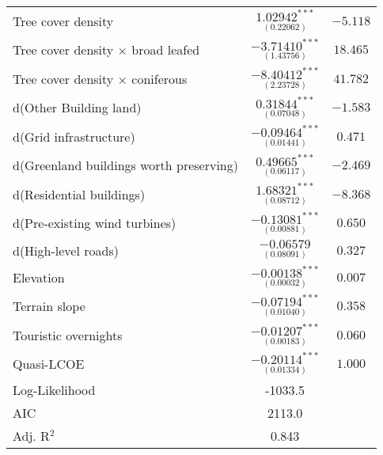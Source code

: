 \begin{ThreePartTable}
\begin{longtable}{l c c}
         Tree cover density                           & $\underset{(0.22062)}{1.02942^{***}}$  & $-5.118$ \\
         Tree cover density $\times$ broad leafed     & $\underset{(1.43756)}{-3.71410^{***}}$ & $18.465$ \\
         Tree cover density $\times$ coniferous       & $\underset{(2.23728)}{-8.40412^{***}}$ & $41.782$ \\
         d(Other Building land)                             & $\underset{(0.07048)}{0.31844^{***}}$  & $-1.583$ \\
         d(Grid infrastructure)                       & $\underset{(0.01441)}{-0.09464^{***}}$ & $0.471$ \\
         d(Greenland buildings worth preserving)      & $\underset{(0.06117)}{0.49665^{***}}$  & $-2.469$    \\
         d(Residential buildings)                     & $\underset{(0.08712)}{1.68321^{***}}$  & $-8.368$  \\
         d(Pre-existing wind turbines)                & $\underset{(0.00881)}{ -0.13081^{***}}$ & $0.650$ \\
         d(High-level roads)                          & $\underset{(0.08091)}{-0.06579}$    &  $0.327$ \\
         Elevation                                    & $\underset{(0.00032)}{-0.00138^{***}}$ & $0.007$ \\     
         Terrain slope                                & $\underset{(0.01040)}{-0.07194^{***}}$ & $0.358$ \\
         Touristic overnights                         & $\underset{(0.00183)}{-0.01207^{***}}$ & $0.060$ \\ 
         Quasi-LCOE                                   & $\underset{(0.01334)}{-0.20114^{***}}$ & $1.000$ \\ \midrule
         Log-Likelihood                               & -1033.5\\
         AIC                                          & 2113.0\\
         Adj. R$^2$                                   & 0.843\\
    \end{longtable}
\end{ThreePartTable}
